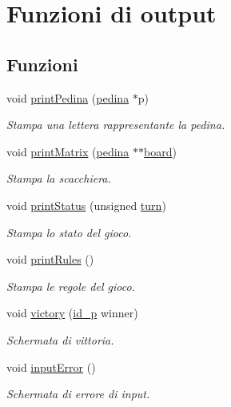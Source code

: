 \hypertarget{group__Output}{}\section{Funzioni di output}
\label{group__Output}
\subsection*{Funzioni}
\begin{DoxyCompactItemize}
\item 
void \hyperlink{group__Output_ga724261d45664de95115edbec3fec7aef}{print\+Pedina} (\hyperlink{ml__lib_8h_a71fee95122b31f5cb0b07d9c16ffa3a5}{pedina} $\ast$p)
\begin{DoxyCompactList}\small\item\em Stampa una lettera rappresentante la pedina. \end{DoxyCompactList}\item 
void \hyperlink{group__Output_gac5423849c2701b9adbd33225a8a20288}{print\+Matrix} (\hyperlink{ml__lib_8h_a71fee95122b31f5cb0b07d9c16ffa3a5}{pedina} $\ast$$\ast$\hyperlink{ml__main_8c_a62a3fe3d1df9ff58883b669f7f24e516}{board})
\begin{DoxyCompactList}\small\item\em Stampa la scacchiera. \end{DoxyCompactList}\item 
void \hyperlink{group__Output_ga0e671ab1d1412c0843d69c03ab2cfbac}{print\+Status} (unsigned \hyperlink{ml__main_8c_a6a9348d5147fb8e94c6d9a0dbeaf0d16}{turn})
\begin{DoxyCompactList}\small\item\em Stampa lo stato del gioco. \end{DoxyCompactList}\item 
void \hyperlink{group__Output_gafa3767d5c549d555cf1817fe57c614fc}{print\+Rules} ()
\begin{DoxyCompactList}\small\item\em Stampa le regole del gioco. \end{DoxyCompactList}\item 
void \hyperlink{group__Output_ga126ef35a3cacdc550c03a737bf1311bf}{victory} (\hyperlink{ml__lib_8h_a0330ff92cbc796e96c3ce3e4401bf1e1}{id\+\_\+p} winner)
\begin{DoxyCompactList}\small\item\em Schermata di vittoria. \end{DoxyCompactList}\item 
void \hyperlink{group__Output_gac50c67875562e21c46610e2c97525c40}{input\+Error} ()
\begin{DoxyCompactList}\small\item\em Schermata di errore di input. \end{DoxyCompactList}\end{DoxyCompactItemize}


